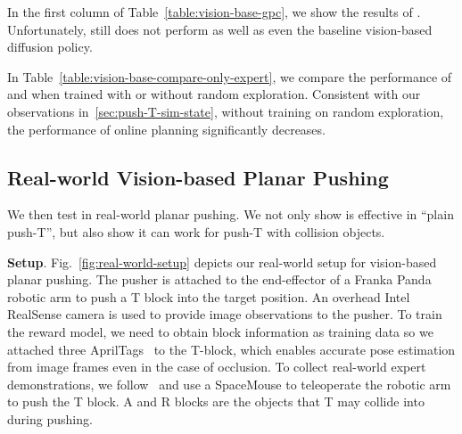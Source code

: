 In the first column of Table~\ref{table:vision-base-gpc}, we show the results of \offlinerl. Unfortunately, \offlinerl still does not perform as well as even the baseline vision-based diffusion policy. 

In Table~\ref{table:vision-base-compare-only-expert}, we compare the performance of \gpcrank and \gpcopt when trained with or without random exploration. Consistent with our observations in~\ref{sec:push-T-sim-state}, without training on random exploration, the performance of online planning significantly decreases. 








\subsection{Real-world Vision-based Planar Pushing}
\label{sec:real-world}

We then test \nameshort in real-world planar pushing. We not only show \nameshort is effective in ``plain push-T'', but also show it can work for push-T with collision objects. 



\textbf{Setup}. Fig.~\ref{fig:real-world-setup} depicts our real-world setup for vision-based planar pushing. The pusher is attached to the end-effector of a Franka Panda robotic arm to push a T block into the target position. An overhead Intel RealSense camera is used to provide image observations to the pusher. To train the reward model, we need to obtain block information as training data so we attached three AprilTags~\citep{olson2011apriltag} to the T-block, which enables accurate pose estimation from image frames even in the case of occlusion. To collect real-world expert demonstrations, we follow~\citet{chi2023diffusion} and use a SpaceMouse to teleoperate the robotic arm to push the T block. A and R blocks are the objects that T may collide into during pushing. 

